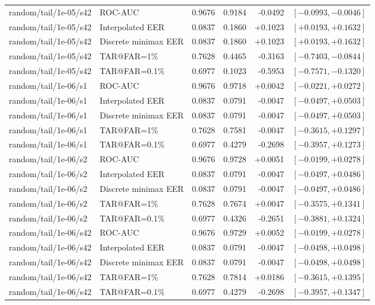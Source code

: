 \documentclass[journal]{IEEEtran}
\begin{document}
\begin{table}[!t]
\begin{tabular}{@{}llrrrr@{}}
random/tail/1e-05/s42 & ROC-AUC & 0.9676 & 0.9184 & -0.0492 & $[-0.0993,-0.0046]$ \\
random/tail/1e-05/s42 & Interpolated EER & 0.0837 & 0.1860 & +0.1023 & $[+0.0193,+0.1632]$ \\
random/tail/1e-05/s42 & Discrete minimax EER & 0.0837 & 0.1860 & +0.1023 & $[+0.0193,+0.1632]$ \\
random/tail/1e-05/s42 & TAR@FAR=1\% & 0.7628 & 0.4465 & -0.3163 & $[-0.7403,-0.0844]$ \\
random/tail/1e-05/s42 & TAR@FAR=0.1\% & 0.6977 & 0.1023 & -0.5953 & $[-0.7571,-0.1320]$ \\
random/tail/1e-06/s1 & ROC-AUC & 0.9676 & 0.9718 & +0.0042 & $[-0.0221,+0.0272]$ \\
random/tail/1e-06/s1 & Interpolated EER & 0.0837 & 0.0791 & -0.0047 & $[-0.0497,+0.0503]$ \\
random/tail/1e-06/s1 & Discrete minimax EER & 0.0837 & 0.0791 & -0.0047 & $[-0.0497,+0.0503]$ \\
random/tail/1e-06/s1 & TAR@FAR=1\% & 0.7628 & 0.7581 & -0.0047 & $[-0.3615,+0.1297]$ \\
random/tail/1e-06/s1 & TAR@FAR=0.1\% & 0.6977 & 0.4279 & -0.2698 & $[-0.3957,+0.1273]$ \\
random/tail/1e-06/s2 & ROC-AUC & 0.9676 & 0.9728 & +0.0051 & $[-0.0199,+0.0278]$ \\
random/tail/1e-06/s2 & Interpolated EER & 0.0837 & 0.0791 & -0.0047 & $[-0.0497,+0.0486]$ \\
random/tail/1e-06/s2 & Discrete minimax EER & 0.0837 & 0.0791 & -0.0047 & $[-0.0497,+0.0486]$ \\
random/tail/1e-06/s2 & TAR@FAR=1\% & 0.7628 & 0.7674 & +0.0047 & $[-0.3575,+0.1341]$ \\
random/tail/1e-06/s2 & TAR@FAR=0.1\% & 0.6977 & 0.4326 & -0.2651 & $[-0.3881,+0.1324]$ \\
random/tail/1e-06/s42 & ROC-AUC & 0.9676 & 0.9729 & +0.0052 & $[-0.0199,+0.0278]$ \\
random/tail/1e-06/s42 & Interpolated EER & 0.0837 & 0.0791 & -0.0047 & $[-0.0498,+0.0498]$ \\
random/tail/1e-06/s42 & Discrete minimax EER & 0.0837 & 0.0791 & -0.0047 & $[-0.0498,+0.0498]$ \\
random/tail/1e-06/s42 & TAR@FAR=1\% & 0.7628 & 0.7814 & +0.0186 & $[-0.3615,+0.1395]$ \\
random/tail/1e-06/s42 & TAR@FAR=0.1\% & 0.6977 & 0.4279 & -0.2698 & $[-0.3957,+0.1347]$ \\
\bottomrule
\end{tabular}
\end{table}
\clearpage
\endgroup
\end{document}
